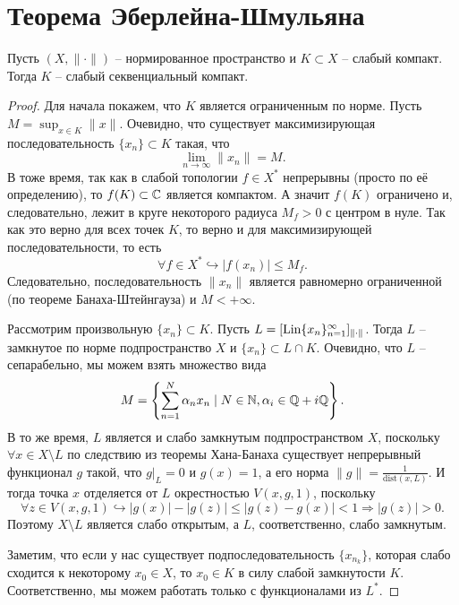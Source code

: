 \section{Теорема Эберлейна-Шмульяна}\label{seq:eberlein-smulyan}
\begin{theorem}
    Пусть $(X, \|\cdot\|)$ -- нормированное пространство и $K \subset X$ -- слабый компакт.
    Тогда $K$ -- слабый секвенциальный компакт.
\end{theorem}
\begin{proof}
    Для начала покажем, что $K$ является ограниченным по норме.
    Пусть $M = \sup_{x \in K} \|x\|$.
    Очевидно, что существует максимизирующая последовательность $\{x_n\} \subset K$ такая, что
    \[
        \lim_{n \rightarrow \infty} \|x_n\| = M.
    \]
    В тоже время, так как в слабой топологии $f \in X^*$ непрерывны (просто по её определению), то $f(K) \subset \mathbb{C}$ является компактом.
    А значит $f(K)$ ограничено и, следовательно, лежит в круге некоторого радиуса $M_f > 0$ с центром в нуле.
    Так как это верно для всех точек $K$, то верно и для максимизирующей последовательности, то есть
    \[
        \forall f \in X^* \hookrightarrow |f(x_n)| \leq M_f.
    \]
    Следовательно, последовательность $\|x_n\|$ является равномерно ограниченной (по теореме Банаха-Штейнгауза) и $M < +\infty$.

    Рассмотрим произвольную $\{x_n\} \subset K$.
    Пусть $L = [\operatorname{Lin}\{x_n\}_{n = 1}^{\infty}]_{\|\cdot\|}$.
    Тогда $L$ -- замкнутое по норме подпространство $X$ и $\{x_n\} \subset L \cap K$.
    Очевидно, что $L$ -- сепарабельно, мы можем взять множество вида
    \[
        M = \left\{\sum_{n = 1}^{N} \alpha_n x_n \mid N \in \mathbb{N}, \alpha_i \in \mathbb{Q} + i\mathbb{Q}\right\}.
    \]
    В то же время, $L$ является и слабо замкнутым подпространством $X$, поскольку $\forall x \in X \setminus L$
    по следствию из теоремы Хана-Банаха существует непрерывный функционал $g$ такой, что $g|_L = 0$ и $g(x) = 1$, а его норма $\|g\| = \frac{1}{\mathrm{dist}(x, L)}$.
    И тогда точка $x$ отделяется от $L$ окрестностью $V(x, g, 1)$, поскольку
    \[
        \forall z \in V(x, g, 1) \hookrightarrow |g(x)| - |g(z)| \leq |g(z) - g(x)| < 1 \Rightarrow |g(z)| > 0.
    \]
    Поэтому $X \setminus L$ является слабо открытым, а $L$, соответственно, слабо замкнутым.

    Заметим, что если у нас существует подпоследовательность $\{x_{n_k}\}$, которая слабо сходится к некоторому $x_0 \in X$, то $x_0 \in K$ в силу слабой замкнутости $K$.
    Соответственно, мы можем работать только с функционалами из $L^*$.


\end{proof}
